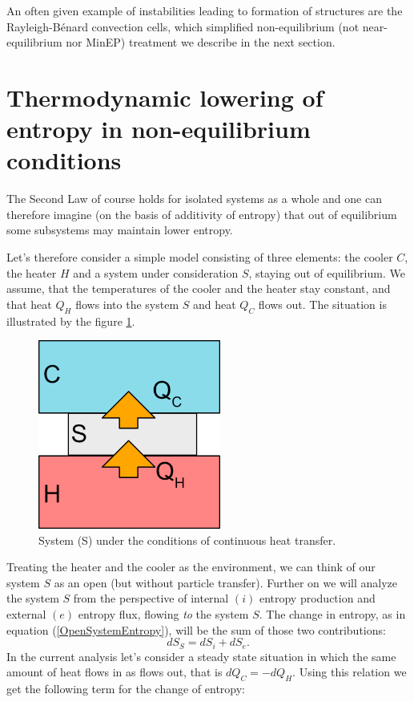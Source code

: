 \documentclass[a4paper,12pt]{article}
\begin{document}
An often given example of instabilities leading to formation of structures are the Rayleigh-Bénard convection cells, which simplified non-equilibrium (not near-equilibrium nor MinEP) treatment we describe in the next section.

\section{Thermodynamic lowering of entropy in non-equilibrium conditions}
\label{simple-model}

The Second Law of course holds for isolated systems as a whole and one can therefore imagine (on the basis of additivity of entropy) that out of equilibrium some subsystems may maintain lower entropy.

Let's therefore consider a simple model consisting of three elements: the cooler $C$, the heater $H$ and a system under consideration $S$, staying out of equilibrium.
We assume, that the temperatures of the cooler and the heater stay constant, and that heat $Q_H$ flows into the system $S$ and heat $Q_C$ flows out. The situation is illustrated by the figure \ref{Fig2}.
\begin{figure}[ht!]
\centering \includegraphics[width=6cm]{system} \caption{System (S) under the conditions of continuous heat transfer.}
\label{Fig2} 
\end{figure}
Treating the heater and the cooler as the environment, we can think of our system $S$ as an open (but without particle transfer).
Further on we will analyze the system $S$ from the perspective of internal $(i)$ entropy production and external $(e)$ entropy flux, flowing \emph{to} the system $S$. 
The change in entropy, as in equation (\ref{OpenSystemEntropy}), will be the sum of those two contributions:
\begin{equation}
dS_S=dS_i+dS_e.
\label{entrosum}
\end{equation}
In the current analysis let's consider a steady state situation in which the same amount of heat flows in as flows out, that is $dQ_C=-dQ_H$. Using this relation we get the following term for the change of entropy:
\end{document}
